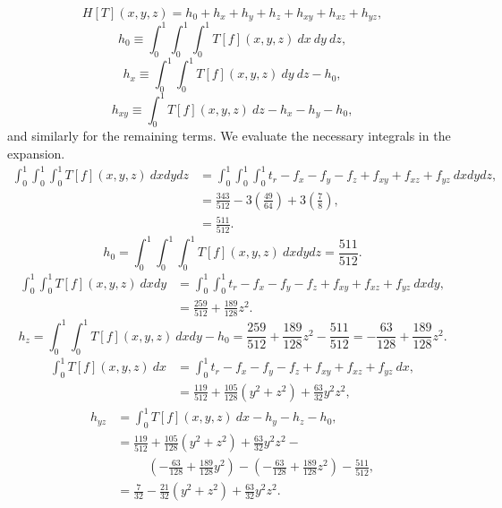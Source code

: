 \begin{equation}
  H[T](x,y,z) = h_0 + h_x + h_y + h_z + h_{xy} + h_{xz} + h_{yz},
\end{equation}
\begin{equation}
  h_0 \equiv \int_0^1\int_0^1\int_0^1 T[f](x,y,z)\ dx\ dy\ dz,
\end{equation}
\begin{equation}
  h_x \equiv \int_0^1\int_0^1 T[f](x,y,z)\ dy\ dz - h_0,
\end{equation}
\begin{equation}
  h_{xy} \equiv \int_0^1 T[f](x,y,z)\ dz - h_x - h_y - h_0,
\end{equation}
and similarly for the remaining terms.  We evaluate the necessary integrals in the expansion.
\begin{align}
  \int_0^1\int_0^1\int_0^1 T[f](x,y,z)\ dxdydz &= \int_0^1\int_0^1\int_0^1 t_r - f_x - f_y - f_z + f_{xy} +
    f_{xz} + f_{yz}\ dxdydz,\nonumber \\
    &= \frac{343}{512} - 3\left(\frac{49}{64}\right) + 3\left(\frac{7}{8}\right), \nonumber\\
    &= \frac{511}{512}.\nonumber
\end{align}
\begin{equation}
  h_0 = \int_0^1\int_0^1\int_0^1 T[f](x,y,z)\ dxdydz = \frac{511}{512}.
\end{equation}
\begin{align}
  \int_0^1\int_0^1 T[f](x,y,z)\ dxdy &= \int_0^1\int_0^1 t_r - f_x - f_y - f_z + f_{xy} +
    f_{xz} + f_{yz}\ dxdy, \nonumber\\
    &= \frac{259}{512} + \frac{189}{128}z^2. \nonumber
\end{align}
\begin{equation}
  h_z = \int_0^1\int_0^1 T[f](x,y,z)\ dxdy - h_0 = \frac{259}{512} + \frac{189}{128}z^2 - \frac{511}{512} =
  -\frac{63}{128} + \frac{189}{128}z^2.
\end{equation}
\begin{align}
  \int_0^1 T[f](x,y,z)\ dx &= \int_0^1 t_r - f_x - f_y - f_z + f_{xy} + f_{xz} + f_{yz}\ dx, \nonumber\\
  &= \frac{119}{512} + \frac{105}{128}(y^2+z^2)+ \frac{63}{32}y^2z^2,\nonumber
\end{align}
\begin{align}
  h_{yz} &=\int_0^1 T[f](x,y,z)\ dx - h_y - h_z - h_0,\nonumber\\
  &= \frac{119}{512} + \frac{105}{128}(y^2+z^2)+ \frac{63}{32}y^2z^2 - \nonumber\\
    &\hspace{30pt} \left(-\frac{63}{128}+\frac{189}{128}y^2\right) - \left(-\frac{63}{128}+\frac{189}{128}z^2\right) -
    \frac{511}{512}, \nonumber \\
  &=\frac{7}{32} - \frac{21}{32}(y^2+z^2) + \frac{63}{32}y^2z^2.
\end{align}
